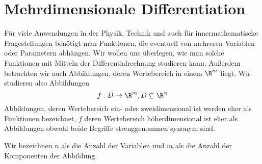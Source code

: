 \chapter{Mehrdimensionale Differentiation}
Für viele Anwendungen in der Physik, Technik und auch für innermathematische Fragestellungen benötigt man Funktionen, die eventuell von mehreren Variablen oder Parametern abhängen. Wir wollen uns überlegen, wie man solche Funktionen mit Mitteln der Differentialrechnung studieren kann. Außerdem betrachten wir auch Abbildungen, deren Wertebereich in einem $\R^m$ liegt.  Wir studieren also Abbildungen
\begin{equation*}
	f:D\rightarrow \R^m, D\subseteq \R^n
\end{equation*}
Abbildungen, deren Wertebereich ein- oder zweidimensional ist werden eher als Funktionen bezeichnet, $f$ deren Wertebereich höherdimensional ist eher als Abbildungen obwohl beide Begriffe strenggenommen synonym sind.

Wir bezeichnen $n$ als die Anzahl der Variablen und $m$ als die Anzahl der Komponenten der Abbildung.


